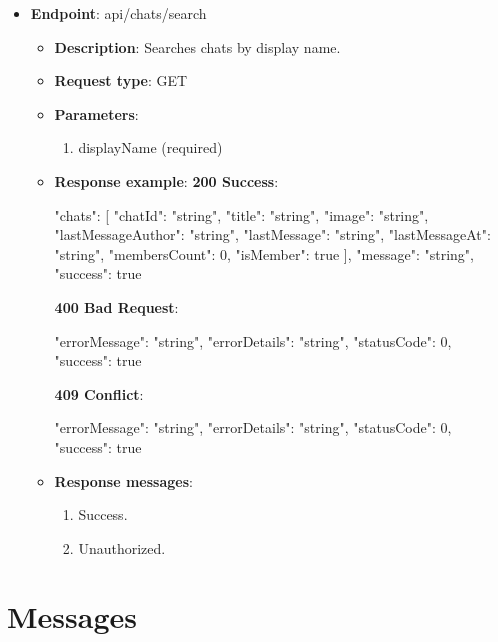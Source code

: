 \begin{itemize}
    \item \textbf{Endpoint}: api/chats/search
    \begin{itemize}
        \item \textbf{Description}: Searches chats by display name.
        \item \textbf{Request type}: GET
        \item \textbf{Parameters}:
        \begin{enumerate}
            \item displayName (required)
        \end{enumerate}
        \item \textbf{Response example}:
        \textbf{200 Success}:
        \begin{spverbatim}
        {
            "chats": [
                {
                "chatId": "string",
                "title": "string",
                "image": "string",
                "lastMessageAuthor": "string",
                "lastMessage": "string",
                "lastMessageAt": "string",
                "membersCount": 0,
                "isMember": true
            }
            ],
            "message": "string",
            "success": true
        }
        \end{spverbatim}
        \textbf{400 Bad Request}:
        \begin{spverbatim}
        {
            "errorMessage": "string",
            "errorDetails": "string",
            "statusCode": 0,
            "success": true
        }
        \end{spverbatim}
        \textbf{409 Conflict}:
        \begin{spverbatim}
        {
            "errorMessage": "string",
            "errorDetails": "string",
            "statusCode": 0,
            "success": true
        }
        \end{spverbatim}
        \item \textbf{Response messages}:
        \begin{enumerate}
            \item Success.
            \item Unauthorized.
        \end{enumerate}
    \end{itemize}

\end{itemize}


\section{Messages}\label{sec:messages}

